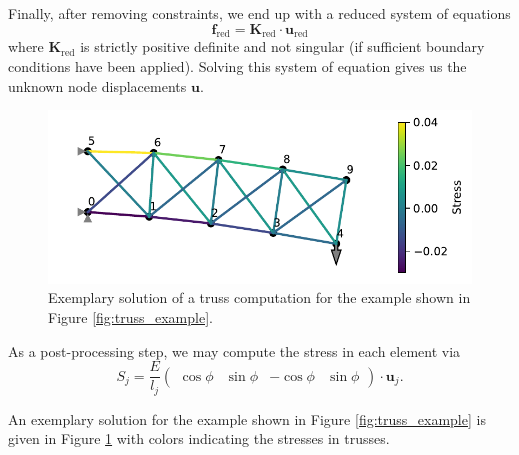 Finally, after removing constraints, we end up with a reduced system of equations 
\begin{equation}
     \mathbf{f}_\textrm{red} = \mathbf{K}_\textrm{red}  \cdot \mathbf{u}_\textrm{red} 
     \label{eq:reduced_system}
\end{equation}
where $\mathbf{K}_\textrm{red}$ is strictly positive definite and not singular (if sufficient boundary conditions have been applied). Solving this system of equation gives us the unknown node displacements $\mathbf{u}$. 

\begin{figure}[!htpb]
    \centering
    \includegraphics[width=\textwidth]{figures/truss_sample_solved.pdf}
    \caption{Exemplary solution of a truss computation for the example shown in Figure \ref{fig:truss_example}.}
    \label{fig:truss_example_solved}
\end{figure}

As a post-processing step, we may compute the stress in each element via
\begin{equation}
    S_j = \frac{E}{l_j} 
    \begin{pmatrix}
        \cos{\phi} & \sin{\phi} & -\cos{\phi} & \sin{\phi}
    \end{pmatrix}
    \cdot 
    \mathbf{u}_j.
\end{equation}

An exemplary solution for the example shown in Figure \ref{fig:truss_example} is given in Figure \ref{fig:truss_example_solved} with colors indicating the stresses in trusses.

